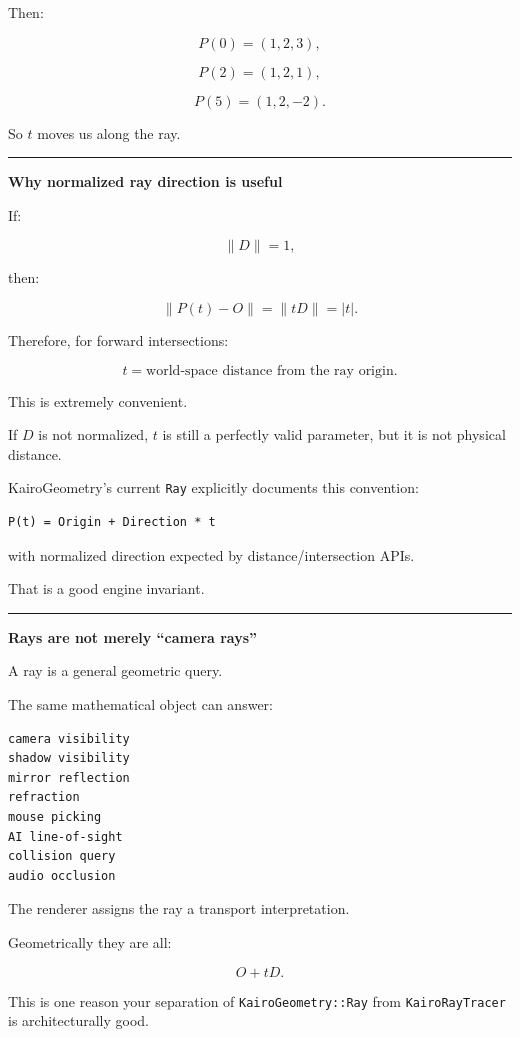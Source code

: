 Then:

\[
P(0)=(1,2,3),
\]

\[
P(2)=(1,2,1),
\]

\[
P(5)=(1,2,-2).
\]

So \(t\) moves us along the ray.

\begin{center}\rule{0.5\linewidth}{0.5pt}\end{center}

\textbf{Why normalized ray direction is useful}

If:

\[
\|D\|=1,
\]

then:

\[
\|P(t)-O\|
=
\|tD\|
=
|t|.
\]

Therefore, for forward intersections:

\[
\boxed{t=\text{world-space distance from the ray origin}.}
\]

This is extremely convenient.

If \(D\) is not normalized, \(t\) is still a perfectly valid parameter, but it is not physical distance.

KairoGeometry's current \texttt{Ray} explicitly documents this convention:

\begin{verbatim}
P(t) = Origin + Direction * t
\end{verbatim}

with normalized direction expected by distance/intersection APIs.

That is a good engine invariant.

\begin{center}\rule{0.5\linewidth}{0.5pt}\end{center}

\textbf{Rays are not merely ``camera rays''}

A ray is a general geometric query.

The same mathematical object can answer:

\begin{verbatim}
camera visibility
shadow visibility
mirror reflection
refraction
mouse picking
AI line-of-sight
collision query
audio occlusion
\end{verbatim}

The renderer assigns the ray a transport interpretation.

Geometrically they are all:

\[
O+tD.
\]

This is one reason your separation of \texttt{KairoGeometry::Ray} from \texttt{KairoRayTracer} is architecturally good.

